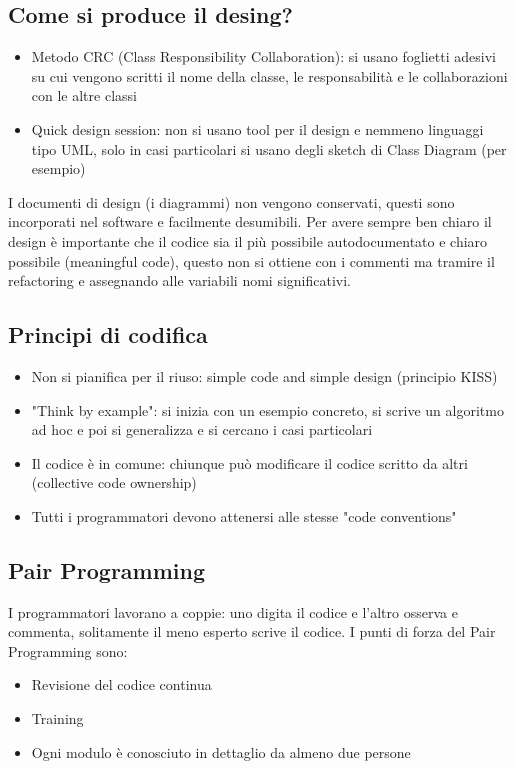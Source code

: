 \documentclass[12pt, a4paper]{report}
\begin{document}
\subsection{Come si produce il desing?}
\begin{itemize}
    \item Metodo CRC (Class Responsibility Collaboration): si usano foglietti adesivi su cui vengono scritti il nome della classe, le responsabilità e le collaborazioni con le altre classi
    \item Quick design session: non si usano tool per il design e nemmeno linguaggi tipo UML, solo in casi particolari si usano degli sketch di Class Diagram (per esempio)
\end{itemize}
I documenti  di design (i diagrammi) non vengono conservati, questi sono incorporati nel software e facilmente desumibili. Per avere sempre ben chiaro il design è importante che il codice sia il più possibile autodocumentato e chiaro possibile (meaningful code), questo non si ottiene con i commenti ma tramire il refactoring e assegnando alle variabili nomi significativi.
\subsection{Principi di codifica}
\begin{itemize}
    \item Non si pianifica per il riuso: simple code and simple design (principio KISS)
    \item "Think by example": si inizia con un esempio concreto, si scrive un algoritmo ad hoc e poi si generalizza e si cercano i casi particolari
    \item Il codice è in comune: chiunque può modificare il codice scritto da altri (collective code ownership)
    \item Tutti  i programmatori devono attenersi alle stesse "code conventions"
\end{itemize}
\subsection{Pair Programming}
I programmatori lavorano a coppie: uno digita il codice e l'altro osserva e commenta, solitamente il meno esperto scrive il codice. I punti di forza del Pair Programming sono:
\begin{itemize}
    \item Revisione del codice continua
    \item Training
    \item Ogni modulo è conosciuto in dettaglio da almeno due persone
\end{itemize}
\end{document}
